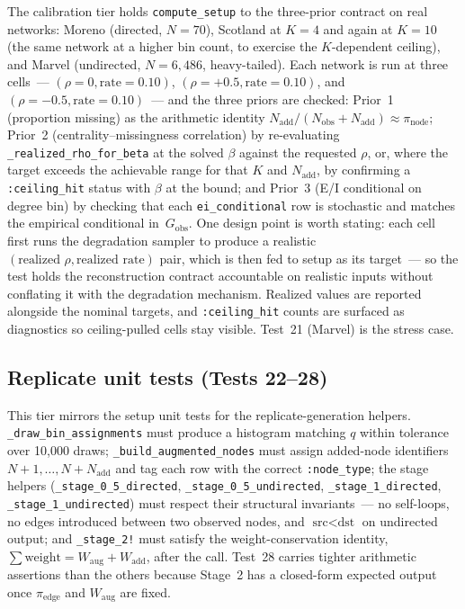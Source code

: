 \documentclass[11pt]{article}
\newcommand{\Gobs}{G_{\text{obs}}}
\begin{document}
The calibration tier holds \texttt{compute\_setup} to the three-prior contract on real networks: Moreno (directed, $N=70$), Scotland at $K=4$ and again at $K=10$ (the same network at a higher bin count, to exercise the $K$-dependent ceiling), and Marvel (undirected, $N=6{,}486$, heavy-tailed). Each network is run at three cells~--- $(\rho = 0, \text{rate} = 0.10)$, $(\rho = +0.5, \text{rate} = 0.10)$, and $(\rho = -0.5, \text{rate} = 0.10)$~--- and the three priors are checked: Prior~1 (proportion missing) as the arithmetic identity $N_{\text{add}} / (N_{\text{obs}} + N_{\text{add}}) \approx \pi_{\text{node}}$; Prior~2 (centrality--missingness correlation) by re-evaluating \texttt{\_realized\_rho\_for\_beta} at the solved $\beta$ against the requested $\rho$, or, where the target exceeds the achievable range for that $K$ and $N_{\text{add}}$, by confirming a \texttt{:ceiling\_hit} status with $\beta$ at the bound; and Prior~3 (E/I conditional on degree bin) by checking that each \texttt{ei\_conditional} row is stochastic and matches the empirical conditional in~$\Gobs$. One design point is worth stating: each cell first runs the degradation sampler to produce a realistic $(\text{realized }\rho, \text{realized rate})$ pair, which is then fed to setup as its target~--- so the test holds the reconstruction contract accountable on realistic inputs without conflating it with the degradation mechanism. Realized values are reported alongside the nominal targets, and \texttt{:ceiling\_hit} counts are surfaced as diagnostics so ceiling-pulled cells stay visible. Test~21 (Marvel) is the stress case.

\subsection{Replicate unit tests (Tests 22--28)}

This tier mirrors the setup unit tests for the replicate-generation helpers. \texttt{\_draw\_bin\_assignments} must produce a histogram matching $q$ within tolerance over 10{,}000 draws; \texttt{\_build\_augmented\_nodes} must assign added-node identifiers $N+1, \dots, N+N_{\text{add}}$ and tag each row with the correct \texttt{:node\_type}; the stage helpers (\texttt{\_stage\_0\_5\_directed}, \texttt{\_stage\_0\_5\_undirected}, \texttt{\_stage\_1\_directed}, \texttt{\_stage\_1\_undirected}) must respect their structural invariants~--- no self-loops, no edges introduced between two observed nodes, and $\text{src} < \text{dst}$ on undirected output; and \texttt{\_stage\_2!} must satisfy the weight-conservation identity, $\sum \text{weight} = W_{\text{aug}} + W_{\text{add}}$, after the call. Test~28 carries tighter arithmetic assertions than the others because Stage~2 has a closed-form expected output once $\pi_{\text{edge}}$ and $W_{\text{aug}}$ are fixed.
\end{document}
